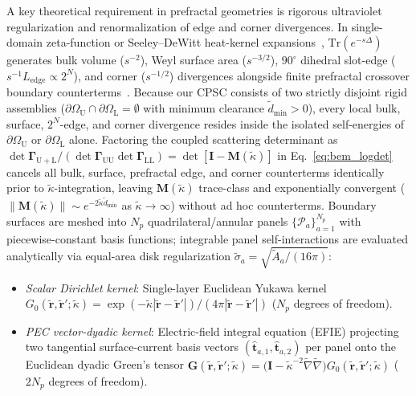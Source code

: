 \documentclass[aps,prd,twocolumn,10pt,showkeys,nofootinbib,floatfix,longbibliography]{revtex4-2}
\begin{document}
A key theoretical requirement in prefractal geometries is rigorous ultraviolet regularization and renormalization of edge and corner divergences. In single-domain zeta-function or Seeley--DeWitt heat-kernel expansions~\cite{vassilevich2003physrep,bordag2009}, $\mathrm{Tr}(e^{-s\Delta})$ generates bulk volume ($s^{-2}$), Weyl surface area ($s^{-3/2}$), $90^\circ$ dihedral slot-edge ($s^{-1} L_{\mathrm{edge}} \propto 2^N$), and corner ($s^{-1/2}$) divergences alongside finite prefractal crossover boundary counterterms~\cite{lapidus1991tams,shajesh2016,gordon2026prd}. Because our CPSC consists of two strictly disjoint rigid assemblies ($\partial\Omega_{\mathrm{U}} \cap \partial\Omega_{\mathrm{L}} = \emptyset$ with minimum clearance $\tilde{d}_{\min} > 0$), every local bulk, surface, $2^N$-edge, and corner divergence resides inside the isolated self-energies of $\partial\Omega_{\mathrm{U}}$ or $\partial\Omega_{\mathrm{L}}$ alone. Factoring the coupled scattering determinant as $\det\mathbf{\Gamma}_{\mathrm{U+L}}/(\det\mathbf{\Gamma}_{\mathrm{UU}}\det\mathbf{\Gamma}_{\mathrm{LL}}) = \det[\mathbf{I} - \mathbf{M}(\tilde{\kappa})]$ in Eq.~\eqref{eq:bem_logdet} cancels all bulk, surface, prefractal edge, and corner counterterms identically prior to $\tilde{\kappa}$-integration, leaving $\mathbf{M}(\tilde{\kappa})$ trace-class and exponentially convergent ($\|\mathbf{M}(\tilde{\kappa})\| \sim e^{-2\tilde{\kappa}\tilde{d}_{\min}}$ as $\tilde{\kappa} \to \infty$) without ad hoc counterterms. Boundary surfaces are meshed into $N_p$ quadrilateral/annular panels $\{\mathcal{P}_a\}_{a=1}^{N_p}$ with piecewise-constant basis functions; integrable panel self-interactions are evaluated analytically via equal-area disk regularization $\tilde{\sigma}_a = \sqrt{\tilde{A}_a/(16\pi)}$:
\begin{itemize}
    \item \emph{Scalar Dirichlet kernel}: Single-layer Euclidean Yukawa kernel $G_0(\tilde{\mathbf{r}}, \tilde{\mathbf{r}}'; \tilde{\kappa}) = \exp(-\tilde{\kappa}|\tilde{\mathbf{r}}-\tilde{\mathbf{r}}'|)/(4\pi|\tilde{\mathbf{r}}-\tilde{\mathbf{r}}'|)$ ($N_p$ degrees of freedom).
    \item \emph{PEC vector-dyadic kernel}: Electric-field integral equation (EFIE) projecting two tangential surface-current basis vectors $(\hat{\mathbf{t}}_{a,1}, \hat{\mathbf{t}}_{a,2})$ per panel onto the Euclidean dyadic Green's tensor $\mathbf{G}(\tilde{\mathbf{r}}, \tilde{\mathbf{r}}'; \tilde{\kappa}) = \bigl(\mathbf{I} - \tilde{\kappa}^{-2}\tilde{\nabla}\tilde{\nabla}\bigr) G_0(\tilde{\mathbf{r}}, \tilde{\mathbf{r}}'; \tilde{\kappa})$ ($2N_p$ degrees of freedom).
\end{itemize}
\end{document}
